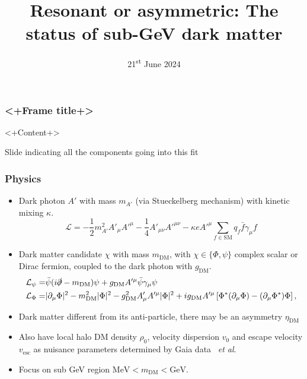 \documentclass[aspectratio=169]{beamer}
\title{Resonant or asymmetric: The status of sub-GeV dark matter }
\subtitle{\arxiv{2405.17548}}
\date{21\textsuperscript{st} June 2024}
\begin{document}
\begin{frame}
    \titlepage
\end{frame}

\begin{frame}
    \frametitle{<+Frame title+>}
    <+Content+>

    Slide indicating all the components going into this fit
\end{frame}

\begin{frame}
    \frametitle{Physics}
    \begin{itemize}
        \item Dark photon $A'$ with mass $\boxed{m_{A'}}$ (via Stueckelberg mechanism) with kinetic mixing $\boxed{\kappa}$.
            \[\mathcal{L} = -\frac{1}{2}m_{A'}^2 A'_\mu A'^\mu - \frac{1}{4}A'_{\mu\nu}A'^{\mu\nu} - \kappa e A'^\mu \sum_{f\in\text{SM}} q_f \bar f \gamma_\mu f\]
        \item Dark matter candidate $\chi$ with mass $\boxed{m_\text{DM}}$, with $\chi\in\{\Phi, \psi\}$ complex scalar or Dirac fermion, coupled to the dark photon with $\boxed{g_\text{DM}}$.
        \begin{align*}
            \mathcal{L}_\psi  =& \bar{\psi}(i \slashed{\partial} - m_\text{DM}) \psi + g_\text{DM} A'^\mu \bar{\psi} \gamma_\mu \psi \\
            \mathcal{L}_\Phi  =& |\partial_\mu \Phi|^2 - m_\text{DM}^2 |\Phi|^2 - g_\text{DM}^2 A'_\mu A'^\mu |\Phi|^2 + i g_\text{DM} A'^\mu \left[\Phi^\ast (\partial_\mu \Phi) - (\partial_\mu \Phi^\ast) \Phi\right],
        \end{align*}
    \item Dark matter different from its anti-particle, there may be an asymmetry $\boxed{\eta_\text{DM}}$
    \item Also have local halo DM density $\rho_0$, velocity dispersion $v_0$ and escape velocity $v_\text{esc}$ as nuisance parameters determined by Gaia data~ \textit{et al}.
    \item Focus on sub GeV region $\text{MeV} < m_\text{DM} < \text{GeV}$.
    \end{itemize}
\end{frame}
\end{document}
